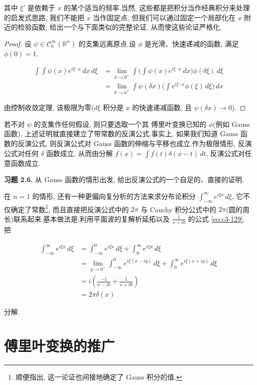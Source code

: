 其中 $\xi'$ 是依赖于 $x$ 的某个适当的频率.当然, 这些都是把积分当作经典积分来处理的启发式思路, 我们不能把 $x$ 当作固定点, 但我们可以通过固定一个局部化在 $x$ 附近的检验函数, 给出一个与下面类似的完整论证, 从而使这些论证严格化.

\begin{proof}
设 $\psi\in\mathcal{C}_0^\infty(\mathbb{R}^n)$ 的支集远离原点.设 $\phi$ 是光滑、快速递减的函数, 满足 $\phi(0) = 1$.

\[
\begin{aligned}
\int\int\psi(x)e^{i\xi\cdot x}\, dx\, d\xi &= \lim_{\delta\to 0^+}\int\Big(\int\psi(x)e^{i\xi\cdot x}\, dx\Big)\phi(\delta\xi)\, d\xi \\
&= \lim_{\delta\to 0^+}\int\psi(\delta x)\Big(\int e^{i\xi\cdot x}\phi(\xi)\, d\xi\Big)\, dx
\end{aligned}
\]

由控制收敛定理, 该极限为零($d\xi$ 积分是 $x$ 的快速递减函数, 且 $\psi(\delta x)\to 0$).
\end{proof}

若不对 $\psi$ 的支集作任何假设, 则只要选取一个其 傅里叶变换已知的 $\phi$(例如 Gauss 函数), 上述证明就直接建立了带常数的反演公式.事实上, 如果我们知道 Gauss 函数的反演公式, 则反演公式对 Gauss 函数的伸缩与平移也成立.作为极限情形, 反演公式对任何 $\delta$ 函数成立, 从而由分解 $f(x) = \int f(t)\delta(x-t)\, dt$, 反演公式对任意函数成立.

\textbf{习题 2.6.} 从 Gauss 函数的情形出发, 给出反演公式的一个自足的、直接的证明.

在 $n = 1$ 的情形, 还有一种更偏向复分析的方法来求分布论积分 $\int_{-\infty}^{\infty} e^{i\xi x}\, d\xi$, 它不仅确定了常数\footnote{顺便指出, 这一论证也间接地确定了 Gauss 积分的值.}, 而且直接把反演公式中的 $2\pi$ 与 Cauchy 积分公式中的 $2\pi$(圆的周长)联系起来.基本做法是:利用平面波的复解析延拓以及 $\frac{1}{x+i0}$ 的公式 \eqref{eq:c3-129}, 把

\[
\begin{aligned}
\int_{-\infty}^{\infty} e^{i\xi x}\, d\xi &= \int_{-\infty}^{0} e^{i\xi x}\, d\xi + \int_{0}^{\infty} e^{i\xi x}\, d\xi \\
&= \lim_{y\to 0^+}\int_{-\infty}^{0} e^{i\xi(x-iy)}\, d\xi + \int_{0}^{\infty} e^{i\xi(x+iy)}\, d\xi \\
&= i\left(\frac{-1}{x-i0} + \frac{1}{x+i0}\right) \\
&= 2\pi\delta(x)
\end{aligned}
\]

分解.


\section{傅里叶变换的推广}

